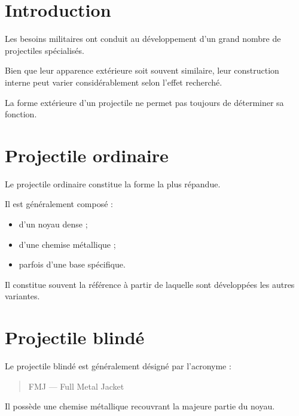 
\section{Introduction}

Les besoins militaires ont conduit au développement d'un grand nombre de
projectiles spécialisés.

Bien que leur apparence extérieure soit souvent similaire, leur construction
interne peut varier considérablement selon l'effet recherché.

\begin{aretenir}

La forme extérieure d'un projectile ne permet pas toujours de déterminer sa
fonction.

\end{aretenir}

\section{Projectile ordinaire}

Le projectile ordinaire constitue la forme la plus répandue.

Il est généralement composé :

\begin{itemize}
    \item d'un noyau dense ;
    \item d'une chemise métallique ;
    \item parfois d'une base spécifique.
\end{itemize}

Il constitue souvent la référence à partir de laquelle sont développées les
autres variantes.

\section{Projectile blindé}

Le projectile blindé est généralement désigné par l'acronyme :

\begin{quote}
FMJ --- Full Metal Jacket
\end{quote}

Il possède une chemise métallique recouvrant la majeure partie du noyau.

